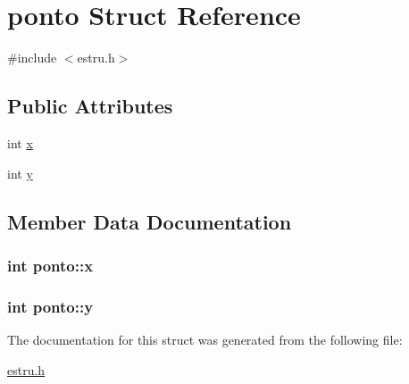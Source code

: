 \hypertarget{structponto}{\section{ponto Struct Reference}
\label{structponto}
}


{\ttfamily \#include $<$estru.\-h$>$}

\subsection*{Public Attributes}
\begin{DoxyCompactItemize}
\item 
int \hyperlink{structponto_abc4237b9184053ddeabe9990c9d8202a}{x}
\item 
int \hyperlink{structponto_a4041361bee7893574a7cf56c91abd26d}{y}
\end{DoxyCompactItemize}


\subsection{Member Data Documentation}
\hypertarget{structponto_abc4237b9184053ddeabe9990c9d8202a}{
\subsubsection[{x}]{\setlength{\rightskip}{0pt plus 5cm}int ponto\-::x}}\label{structponto_abc4237b9184053ddeabe9990c9d8202a}
\hypertarget{structponto_a4041361bee7893574a7cf56c91abd26d}{
\subsubsection[{y}]{\setlength{\rightskip}{0pt plus 5cm}int ponto\-::y}}\label{structponto_a4041361bee7893574a7cf56c91abd26d}


The documentation for this struct was generated from the following file\-:\begin{DoxyCompactItemize}
\item 
\hyperlink{estru_8h}{estru.\-h}\end{DoxyCompactItemize}
